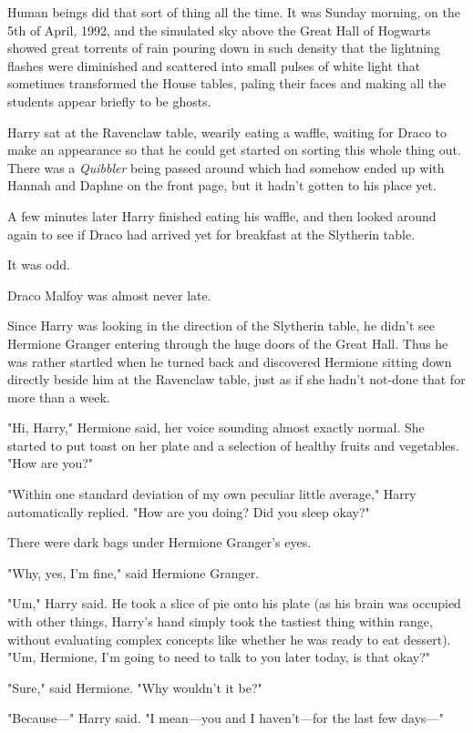 Human beings did that sort of thing all the time.
\sbreak
It was Sunday morning, on the 5th of April, 1992, and the simulated sky above 
the Great Hall of Hogwarts showed great torrents of rain pouring down in such 
density that the lightning flashes were diminished and scattered into small 
pulses of white light that sometimes transformed the House tables, paling their 
faces and making all the students appear briefly to be ghosts.

Harry sat at the Ravenclaw table, wearily eating a waffle, waiting for Draco to 
make an appearance so that he could get started on sorting this whole thing 
out. There was a \emph{Quibbler} being passed around which had somehow ended up 
with Hannah and Daphne on the front page, but it hadn't gotten to his place yet.

A few minutes later Harry finished eating his waffle, and then looked around 
again to see if Draco had arrived yet for breakfast at the Slytherin table.

It was odd.

Draco Malfoy was almost never late.

Since Harry was looking in the direction of the Slytherin table, he didn't see 
Hermione Granger entering through the huge doors of the Great Hall. Thus he was 
rather startled when he turned back and discovered Hermione sitting down 
directly beside him at the Ravenclaw table, just as if she hadn't not-done that 
for more than a week.

"Hi, Harry," Hermione said, her voice sounding almost exactly normal. She 
started to put toast on her plate and a selection of healthy fruits and 
vegetables. "How are you?"

"Within one standard deviation of my own peculiar little average," Harry 
automatically replied. "How are you doing? Did you sleep okay?"

There were dark bags under Hermione Granger's eyes.

"Why, yes, I'm fine," said Hermione Granger.

"Um," Harry said. He took a slice of pie onto his plate (as his brain was 
occupied with other things, Harry's hand simply took the tastiest thing within 
range, without evaluating complex concepts like whether he was ready to eat 
dessert). "Um, Hermione, I'm going to need to talk to you later today, is that 
okay?"

"Sure," said Hermione. "Why wouldn't it be?"

"Because---" Harry said. "I mean---you and I haven't---for the last few days---"

